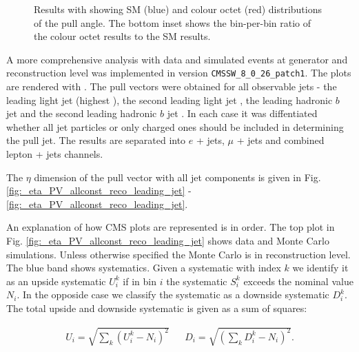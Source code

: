 \begin{figure}[htp]
\centering
  \def\twidth{0.45}
  \centering
\caption{Results with \RIVET showing SM (blue) and \PW colour octet (red) distributions of the pull angle. The bottom inset shows the bin-per-bin ratio of the \PW colour octet results to the SM results.}
\label{fig:resultsRivet}
\end{figure}

A more comprehensive analysis with data and simulated events at generator and reconstruction level was implemented in \CMSSW version \lstinline[language=sh]|CMSSW_8_0_26_patch1|. The plots are rendered with \ROOT \cite{Brun}. The pull vectors were obtained for all observable jets - the leading light jet \leadingjet (highest \pt), the second leading light jet \scndleadingjet, the leading hadronic $b$ jet \leadingb and the second leading hadronic $b$ jet \scndleadingb. In each case it was diffentiated whether all jet particles or only charged ones should be included in determining the pull jet. The results are separated into $e$ + jets, $\mu$ + jets and combined lepton + jets channels.

The $\eta$ dimension of the pull vector with all jet components is given in Fig. \ref{fig:_eta_PV_allconst_reco_leading_jet} - \ref{fig:_eta_PV_allconst_reco_leading_jet}.

An explanation of how CMS plots are represented is in order. The top plot in Fig. \ref{fig:_eta_PV_allconst_reco_leading_jet} shows data and Monte Carlo simulations. Unless otherwise specified the Monte Carlo is in reconstruction level. The blue band shows systematics. Given a systematic with index $k$ we identify it as an upside systematic $U^{k}_{i}$ if in bin $i$ the systematic $S^{k}_i$ exceeds the nominal value $N_{i}$. In the opposide case we classify the systematic as a downside systematic $D^{k}_{i}$. The total upside and downside systematic is given as a sum of squares:

\begin{align}
U_{i}=\sqrt{\sum_{k}\left(U^{k}_{i}-N_{i}\right)^{2}} && D_{i}=\sqrt{\left(\sum_{k}D^{k}_{i}-N_{i}\right)^{2}}.
\end{align}

